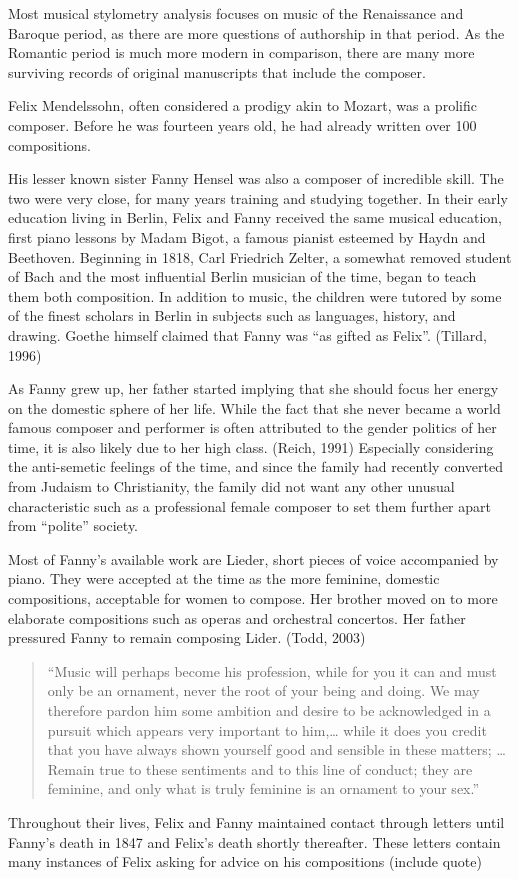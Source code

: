 \documentclass[12pt,twoside]{reedthesis}
\theoremstyle{definition}
\theoremstyle{definition}
\theoremstyle{definition}
\theoremstyle{remark}
\begin{document}
Most musical stylometry analysis focuses on music of the Renaissance and
Baroque period, as there are more questions of authorship in that
period. As the Romantic period is much more modern in comparison, there
are many more surviving records of original manuscripts that include the
composer.

Felix Mendelssohn, often considered a prodigy akin to Mozart, was a
prolific composer. Before he was fourteen years old, he had already
written over 100 compositions.

His lesser known sister Fanny Hensel was also a composer of incredible
skill. The two were very close, for many years training and studying
together. In their early education living in Berlin, Felix and Fanny
received the same musical education, first piano lessons by Madam Bigot,
a famous pianist esteemed by Haydn and Beethoven. Beginning in 1818,
Carl Friedrich Zelter, a somewhat removed student of Bach and the most
influential Berlin musician of the time, began to teach them both
composition. In addition to music, the children were tutored by some of
the finest scholars in Berlin in subjects such as languages, history,
and drawing. Goethe himself claimed that Fanny was ``as gifted as
Felix''. (Tillard, 1996)

As Fanny grew up, her father started implying that she should focus her
energy on the domestic sphere of her life. While the fact that she never
became a world famous composer and performer is often attributed to the
gender politics of her time, it is also likely due to her high class.
(Reich, 1991) Especially considering the anti-semetic feelings of the
time, and since the family had recently converted from Judaism to
Christianity, the family did not want any other unusual characteristic
such as a professional female composer to set them further apart from
``polite'' society.

Most of Fanny's available work are Lieder, short pieces of voice
accompanied by piano. They were accepted at the time as the more
feminine, domestic compositions, acceptable for women to compose. Her
brother moved on to more elaborate compositions such as operas and
orchestral concertos. Her father pressured Fanny to remain composing
Lider. (Todd, 2003)
\begin{quote}
``Music will perhaps become his profession, while for you it can and
must only be an ornament, never the root of your being and doing. We may
therefore pardon him some ambition and desire to be acknowledged in a
pursuit which appears very important to him,\ldots{} while it does you
credit that you have always shown yourself good and sensible in these
matters; \ldots{} Remain true to these sentiments and to this line of
conduct; they are feminine, and only what is truly feminine is an
ornament to your sex.''
\end{quote}
Throughout their lives, Felix and Fanny maintained contact through
letters until Fanny's death in 1847 and Felix's death shortly
thereafter. These letters contain many instances of Felix asking for
advice on his compositions (include quote)
\end{document}
